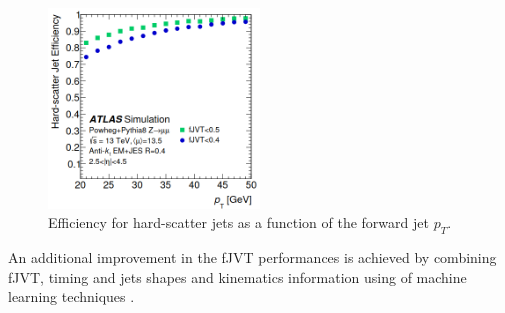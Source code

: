 \begin{figure}[htbp]
    \centering
    \includegraphics[width=0.5\textwidth]{Ch4/Img/fJVT_Eff.png}
    \caption{Efficiency for hard-scatter jets as a function of the forward jet $p_T$.}
    \label{fig:Jet:Tag:JVT:Eff}
\end{figure}
An additional improvement in the fJVT performances is achieved by combining fJVT, timing and jets shapes and kinematics information using of machine learning techniques \cite{Louis_Thesis}.   

